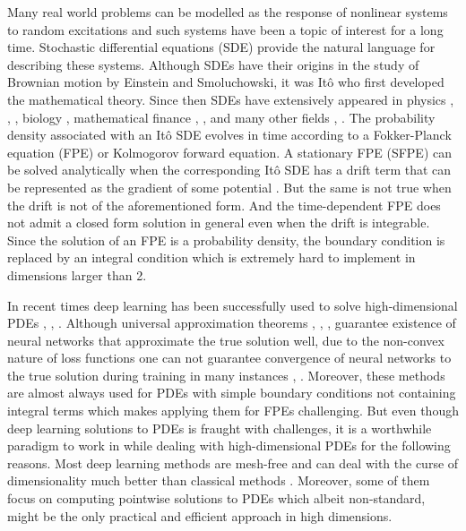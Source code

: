 Many real world problems can be modelled as the response of nonlinear systems to random excitations and such systems have been a topic of interest for a long time. Stochastic differential equations (SDE) provide the natural language for describing these systems. Although SDEs have their origins in the study of Brownian motion by Einstein and Smoluchowski, it was Itô who first developed the mathematical theory. Since then SDEs have extensively appeared in physics \cite{lelievre2016partial}, \cite{strauss2017hitch},      \cite{ivanov1980method}, biology \cite{allen2010introduction}, mathematical finance \cite{delong2013backward}, \cite{karoui1997non}, and many other fields \cite{oksendal2003stochastic}, \cite{gardiner2009stochastic}. 
The probability density associated with an Itô SDE evolves in time according to a Fokker-Planck equation (FPE) or Kolmogorov forward equation. A stationary FPE (SFPE) can be solved analytically when the corresponding Itô SDE has a drift term that can be represented as the gradient of some potential \cite{risken1996fokker}. 
But the same is not true when the drift is not of the aforementioned form. And the time-dependent FPE does not admit a closed form solution in general even when the drift is integrable. Since the solution of an FPE is a probability density, the boundary condition is replaced by an integral condition which is extremely hard to implement in dimensions larger than 2.

In recent times deep learning has been successfully used to solve high-dimensional PDEs \cite{sirignano2018dgm}, \cite{han2018solving}, \cite{raissi2019physics}. Although universal approximation theorems \cite{pinkus1999approximation}, \cite{lu2020universal}, \cite{de2021approximation}, \cite{kovachki2021universal} guarantee existence of neural networks that approximate the true solution well, due to the non-convex nature of loss functions one can not guarantee convergence of neural networks to the true solution during training in many instances \cite{krishnapriyan2021characterizing}, \cite{basir2022investigating}.
Moreover, these methods are almost always used for PDEs with simple boundary conditions not containing integral terms which makes applying them for FPEs challenging. But even though deep learning solutions to PDEs is fraught with challenges, it is a worthwhile paradigm to work in while dealing with high-dimensional PDEs for the following reasons. 
Most deep learning methods are mesh-free \cite{blechschmidt2021three} and can deal with the curse of dimensionality much better than classical methods \cite{cioica2022deep}. Moreover, some of them focus on computing pointwise solutions to PDEs \cite{han2018solving} which albeit non-standard, might be the only practical and efficient approach in high dimensions. 

